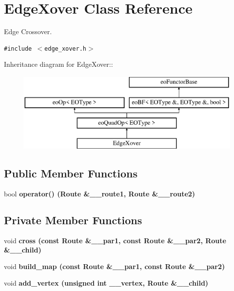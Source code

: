 \section{Edge\-Xover Class Reference}
\label{class_edge_xover}
Edge Crossover.  


{\tt \#include $<$edge\_\-xover.h$>$}

Inheritance diagram for Edge\-Xover::\begin{figure}[H]
\begin{center}
\leavevmode
\includegraphics[height=4cm]{class_edge_xover}
\end{center}
\end{figure}
\subsection*{Public Member Functions}
\begin{CompactItemize}
\item 
bool \bf{operator()} (\bf{Route} \&\_\-\_\-route1, \bf{Route} \&\_\-\_\-route2)\label{class_edge_xover_cb1c0a103106a4d3319540cb23163a79}

\end{CompactItemize}
\subsection*{Private Member Functions}
\begin{CompactItemize}
\item 
void \bf{cross} (const \bf{Route} \&\_\-\_\-par1, const \bf{Route} \&\_\-\_\-par2, \bf{Route} \&\_\-\_\-child)\label{class_edge_xover_88c2d4c9a878454a32d56010f3dddc27}

\item 
void \bf{build\_\-map} (const \bf{Route} \&\_\-\_\-par1, const \bf{Route} \&\_\-\_\-par2)\label{class_edge_xover_04de96aa1016836e0ba5f4b952a5fa16}

\item 
void \bf{add\_\-vertex} (unsigned int \_\-\_\-vertex, \bf{Route} \&\_\-\_\-child)\label{class_edge_xover_b590458c35c16a14896a4bcdf9674ade}

\end{CompactItemize}
